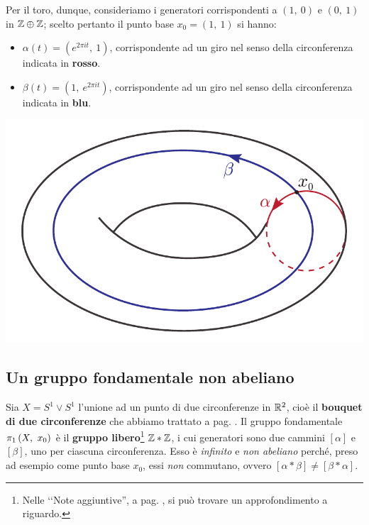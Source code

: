 \begin{minipage}{.52\linewidth}
Per il toro, dunque, consideriamo i generatori corrispondenti a $(1,\ 0)$ e $(0,\ 1)$ in $\mathbb{Z}\oplus\mathbb{Z}$; scelto pertanto il punto base $x_0=(1,\ 1)$ si hanno:
\begin{itemize}
	\item $\alpha(t)=(e^{2\pi i t},\ 1)$, corrispondente ad un giro nel senso della circonferenza indicata in \textcolor{redill}{\textbf{rosso}}.
	\item $\beta(t)=(1,\ e^{2\pi i t})$, corrispondente ad un giro nel senso della circonferenza indicata in \textcolor{blueill}{\textbf{blu}}.
\end{itemize}
\end{minipage}
	\begin{minipage}{.47\linewidth}
		\begin{center}
				\includegraphics[trim=0cm 0cm 0cm 0cm,clip,scale=0.5]{images/torusgenerator.pdf}
		\end{center}
\end{minipage}
\subsection{Un gruppo fondamentale non abeliano}
Sia $X=S^1\vee S^1$ l'unione ad un punto di due circonferenze in $\mathbb{R}^2$, cioè il \textbf{bouquet di due circonferenze} che abbiamo trattato a pag. \pageref{bouquet}. Il gruppo fondamentale $\gruf{X}{x_0}$ è il \textbf{gruppo libero}\footnote{Nelle ‘‘Note aggiuntive'', a pag. \pageref{gruppolibero}, si può trovare un approfondimento a riguardo.} $\mathbb{Z}\ast\mathbb{Z}$, i cui generatori sono due cammini $[\alpha]$ e $[\beta]$, uno per ciascuna circonferenza. Esso è \textit{infinito} e \textit{non abeliano} perché, preso ad esempio come punto base $x_0$, essi \textit{non} commutano, ovvero $[\alpha\ast\beta]\neq [\beta\ast\alpha]$.
